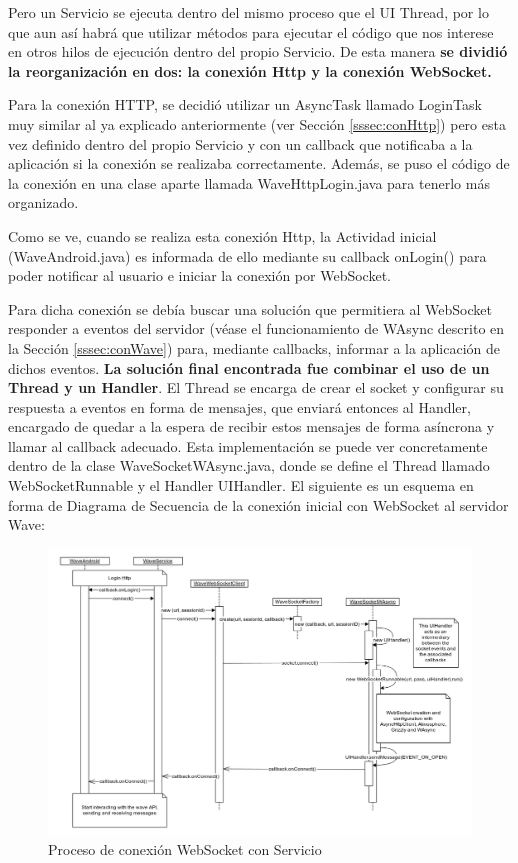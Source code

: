     Pero un Servicio se ejecuta dentro del mismo proceso que el UI Thread, por lo que aun así habrá que utilizar métodos para ejecutar el código que nos interese en otros hilos de ejecución dentro del propio Servicio. De esta manera \textbf{se dividió la reorganización en dos: la conexión Http y la conexión WebSocket.}
    
    Para la conexión HTTP, se decidió utilizar un AsyncTask llamado LoginTask muy similar al ya explicado anteriormente (ver Sección \ref{sssec:conHttp}) pero esta vez definido dentro del propio Servicio y con un callback que notificaba a la aplicación si la conexión se realizaba correctamente. Además, se puso el código de la conexión en una clase aparte llamada WaveHttpLogin.java para tenerlo más organizado.
    
    Como se ve, cuando se realiza esta conexión Http, la Actividad inicial (WaveAndroid.java) es informada de ello mediante su callback onLogin() para poder notificar al usuario e iniciar la conexión por WebSocket. 
    
    Para dicha conexión se debía buscar una solución que permitiera al WebSocket responder a eventos del servidor (véase el funcionamiento de WAsync descrito en la Sección \ref{sssec:conWave}) para, mediante callbacks, informar a la aplicación de dichos eventos. \textbf{La solución final encontrada fue combinar el uso de un Thread y un Handler}. El Thread se encarga de crear el socket y configurar su respuesta a eventos en forma de mensajes, que enviará entonces al Handler, encargado de quedar a la espera de recibir estos mensajes de forma asíncrona y llamar al callback adecuado. Esta implementación se puede ver concretamente dentro de la clase WaveSocketWAsync.java, donde se define el Thread llamado WebSocketRunnable y el Handler UIHandler. El siguiente es un esquema en forma de Diagrama de Secuencia de la conexión inicial con WebSocket al servidor Wave:
    
  \begin{figure}[!]
   \centering
	\includegraphics[keepaspectratio, scale=0.43]{Media/Diagrams/waveServerConnectionSequenceDiagram.png}
    \caption{Proceso de conexión WebSocket con Servicio}
   \label{fig:sequenceDiagram_waveWebSocket}
  \end{figure}
     

